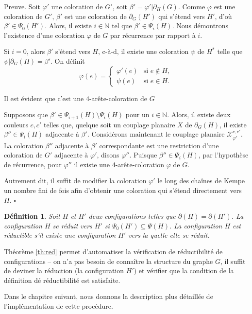 \documentclass[10pt,a4paper]{article}
\newtheorem{definition}{Définition}
\newcommand{\ep}{{\hfill $\square$}}
\begin{document}
Preuve. Soit $\varphi'$ une coloration de $G'$, soit $\beta'=\varphi'|\partial_H(G)$. Comme $\varphi$ est une coloration de $G'$, $\beta'$ est une coloration de $\partial_G(H')$ qui s'étend vers $H'$, d'où $\beta'\in \Psi_0(H')$.
Alors, il existe $i\in \mathbb{N}$ tel que $\beta' \in \Psi_{i}(H)$.
Nous démontrons l'existence d'une coloration $\varphi$ de $G$ par récurrence par rapport à $i$.

Si $i=0$, alors $\beta'$ s'étend vers $H$, c-à-d, il existe une coloration $\psi$ de $H^*$ telle que $\psi|\partial_G(H)=\beta'$. On définit
$$
\varphi (e) = 
\begin{cases}
\varphi'(e) & \text{si }e\notin H, \\
\psi(e) & \text{si } e\in H.
\end{cases}
$$

Il est évident que c'est une 4-arête-coloration de $G$

Supposons que $\beta' \in \Psi_{i+1}(H)\setminus \Psi_i(H)$ pour un $i\in \mathbb{N}$. Alors, il existe deux couleurs $c,c'$ telles que, quelque soit un couplage planaire $X$ de $\partial_G(H)$, il existe $\beta''\in \Psi_i(H)$ adjacente à $\beta'$. Considérons maintenant le couplage planaire $\mathcal{X}_{\varphi'}^{c,c'}$. La coloration $\beta''$ adjacente à $\beta'$ correspondante est une restriction d'une coloration de $G'$ adjacente à $\varphi'$, disons $\varphi''$. Puisque $\beta''\in \Psi_i(H)$, par l'hypothèse de récurrence, pour $\varphi''$ il existe une 4-arête-coloration $\varphi$ de $G$.

Autrement dit, il suffit de modifier la coloration $\varphi'$ le long des chaînes de Kempe un nombre fini de fois afin d'obtenir une coloration qui s'étend directement vers $H$. \ep

\begin{definition}
Soit $H$ et $H'$ deux configurations telles que $\partial(H)=\partial(H')$. La configuration $H$ \emph{se réduit} vers $H'$ si $\Psi_0(H')\subseteq \Psi(H)$. La configuration $H$ est \emph{réductible} s'il existe une configuration $H'$ vers la quelle elle se réduit.
\end{definition}

Théorème \ref{th:red} permet d'automatiser la vérification de réductibilité de configurations -- on n'a pas besoin de connaître la structure du graphe $G$, il suffit de deviner la réduction (la configuration $H'$) et vérifier que la condition de la définition dé réductibilité est satisfaite.

Dans le chapitre suivant, nous donnons la description plus détaillée de l'implémentation de cette procédure.
\end{document}
